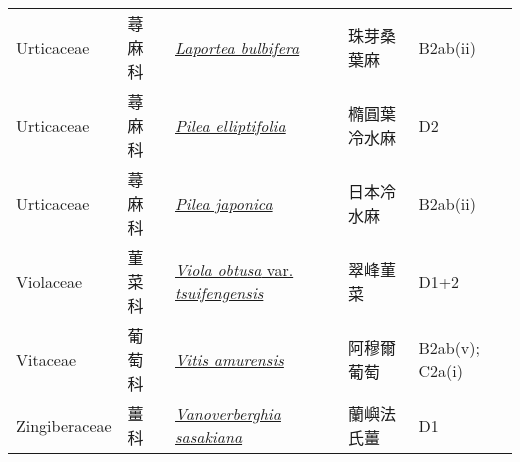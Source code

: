 {\begin{longtable}{L{2.5cm}L{2cm}L{5cm}L{2.5cm}L{3cm}}
    Urticaceae & 蕁麻科 & \href{http://www.theplantlist.org/tpl1.1/search?q=Laportea+bulbifera}{\textit{Laportea bulbifera} } & 珠芽桑葉麻 & B2ab(ii)    \\
    Urticaceae & 蕁麻科 & \href{http://www.theplantlist.org/tpl1.1/search?q=Pilea+elliptifolia}{\textit{Pilea elliptifolia} } & 橢圓葉冷水麻 & D2    \\
    Urticaceae & 蕁麻科 & \href{http://www.theplantlist.org/tpl1.1/search?q=Pilea+japonica}{\textit{Pilea japonica} } & 日本冷水麻 & B2ab(ii)    \\
    Violaceae & 菫菜科 & \href{http://www.theplantlist.org/tpl1.1/search?q=Viola+obtusa+var.+tsuifengensis}{\textit{Viola obtusa} var. \textit{tsuifengensis} } & 翠峰菫菜 & D1+2    \\
    Vitaceae & 葡萄科 & \href{http://www.theplantlist.org/tpl1.1/search?q=Vitis+amurensis}{\textit{Vitis amurensis} } & 阿穆爾葡萄 & B2ab(v); C2a(i)    \\
    Zingiberaceae & 薑科 & \href{http://www.theplantlist.org/tpl1.1/search?q=Vanoverberghia+sasakiana}{\textit{Vanoverberghia sasakiana} } & 蘭嶼法氏薑 & D1    \\
    \bottomrule
        \end{longtable}
        }
    